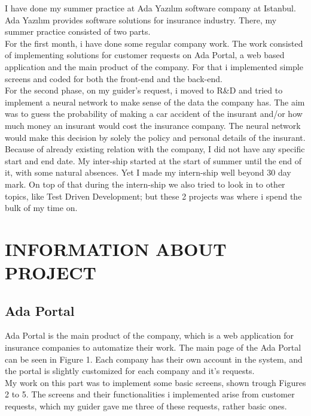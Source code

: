\documentclass[titlepage, a4paper, 14pt]{extarticle} %
\begin{document}
I have done my summer practice at Ada Yazılım software company at Istanbul. Ada Yazılım provides software solutions for insurance industry. There, my summer practice consisted of two parts. \\
For the first month, i have done some regular company work. The work consisted of implementing solutions for customer requests on Ada Portal, a web based application and the main product of the company. For that i implemented simple screens and coded for both the front-end and the back-end. \\
For the second phase, on my guider's request, i moved to R\&D and tried to implement a neural network to make sense of the data the company has. The aim was to guess the probability of making a car accident of the insurant and/or how much money an insurant would cost the insurance company. The neural network would make this decision by solely the policy and personal details of the insurant. \\

Because of already existing relation with  the company, I did not have any specific start and end date. My inter-ship started at the start of summer until the end of it, with some natural absences. Yet I made my intern-ship well beyond 30 day mark. On top of that during the intern-ship we also tried to look in to other topics, like Test Driven Development; but these 2 projects was where i spend the bulk of my time on.


\section{INFORMATION ABOUT PROJECT} \label{info}

\subsection{Ada Portal} \label{portal}

Ada Portal is the main product of the company, which is a web application for insurance companies to automatize their work. The main page of the Ada Portal can be seen in Figure 1. Each company has their own account in the system, and the portal is slightly customized for each company and it's requests. \\


My work on this part was to implement some basic screens, shown trough Figures 2 to 5. The screens and their functionalities i implemented arise from customer requests, which my guider gave me three of these requests, rather basic ones. \\
\end{document}
